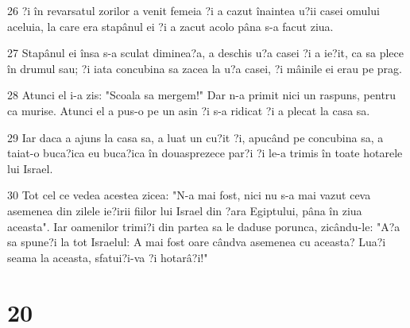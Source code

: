 \par 26 ?i în revarsatul zorilor a venit femeia ?i a cazut înaintea u?ii casei omului aceluia, la care era stapânul ei ?i a zacut acolo pâna s-a facut ziua.
\par 27 Stapânul ei însa s-a sculat diminea?a, a deschis u?a casei ?i a ie?it, ca sa plece în drumul sau; ?i iata concubina sa zacea la u?a casei, ?i mâinile ei erau pe prag.
\par 28 Atunci el i-a zis: "Scoala sa mergem!" Dar n-a primit nici un raspuns, pentru ca murise. Atunci el a pus-o pe un asin ?i s-a ridicat ?i a plecat la casa sa.
\par 29 Iar daca a ajuns la casa sa, a luat un cu?it ?i, apucând pe concubina sa, a taiat-o buca?ica eu buca?ica în douasprezece par?i ?i le-a trimis în toate hotarele lui Israel.
\par 30 Tot cel ce vedea acestea zicea: "N-a mai fost, nici nu s-a mai vazut ceva asemenea din zilele ie?irii fiilor lui Israel din ?ara Egiptului, pâna în ziua aceasta". Iar oamenilor trimi?i din partea sa le daduse porunca, zicându-le: "A?a sa spune?i la tot Israelul: A mai fost oare cândva asemenea cu aceasta? Lua?i seama la aceasta, sfatui?i-va ?i hotarâ?i!"

\chapter{20}

